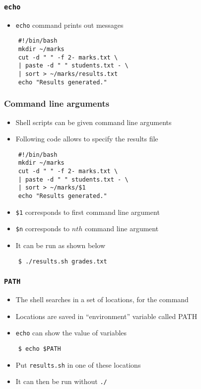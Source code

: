 \documentclass[12pt,compress]{beamer}
\begin{document}
\begin{frame}[fragile]
  \frametitle{\texttt{echo}}
  \begin{itemize}
  \item \texttt{echo} command prints out messages
  \end{itemize}
  \begin{lstlisting}
    #!/bin/bash
    mkdir ~/marks
    cut -d " " -f 2- marks.txt \
    | paste -d " " students.txt - \
    | sort > ~/marks/results.txt
    echo "Results generated."
  \end{lstlisting} %
\end{frame}

\begin{frame}[fragile]
  \frametitle{Command line arguments}
  \begin{itemize}
  \item Shell scripts can be given command line arguments
  \item Following code allows to specify the results file
  \end{itemize}
  \begin{lstlisting}
    #!/bin/bash
    mkdir ~/marks
    cut -d " " -f 2- marks.txt \
    | paste -d " " students.txt - \
    | sort > ~/marks/$1
    echo "Results generated."
  \end{lstlisting} %
  \begin{itemize}
  \item \texttt{\$1} corresponds to first command line argument 
  \item \texttt{\$n} corresponds to $n{th}$ command line argument
  \item It can be run as shown below
  \end{itemize}
  \begin{lstlisting}
    $ ./results.sh grades.txt
  \end{lstlisting} %
\end{frame}

\begin{frame}[fragile]
  \frametitle{\texttt{PATH}}
  \begin{itemize}
  \item The shell searches in a set of locations, for the command 
  \item Locations are saved in ``environment'' variable called PATH
  \item \texttt{echo} can show the value of variables
  \end{itemize}
  \begin{lstlisting}
    $ echo $PATH
  \end{lstlisting} %
  \begin{itemize}
  \item Put \texttt{results.sh} in one of these locations
  \item It can then be run without \texttt{./} 
  \end{itemize}
\end{frame}
\end{document}
